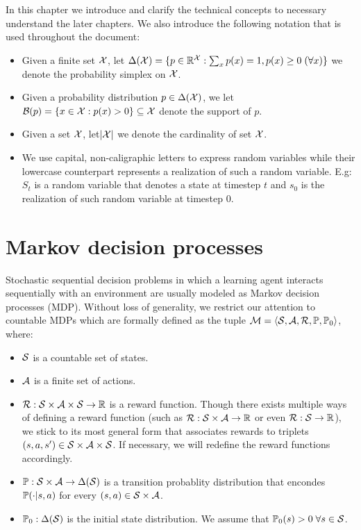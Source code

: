 In this chapter we introduce and clarify the technical concepts to necessary understand the later chapters. We also introduce the following notation that is used throughout the document:
\begin{itemize}
  \item Given a finite set $\mathcal{X}$, let $\Delta(\mathcal{X})=\{p\in\mathbb{R}^{\mathcal{X}}:\sum_x p(x)=1, p(x)\geq 0\;(\forall x)\}$ we denote the probability simplex on $\mathcal{X}$. 
  \item Given a probability distribution $p\in\Delta(\mathcal{X})$, we let $\mathcal{B}(p)=\{x\in\mathcal{X}:p(x) > 0\}\subseteq\mathcal{X}$ denote the support of $p$.
  \item Given a set $\mathcal{X}$, let$\lvert\mathcal{X}\rvert$ we denote the cardinality of set $\mathcal{X}$.
  \item We use capital, non-caligraphic letters to express random variables while their lowercase counterpart represents a realization of such a random variable. E.g: $S_t$ is a random variable that denotes a state at timestep $t$ and $s_0$ is the realization of such random variable at timestep $0$.
\end{itemize}
\section{Markov decision processes}
Stochastic sequential decision problems in which a learning agent interacts sequentially with an environment are usually modeled as Markov decision processes (MDP). Without loss of generality, we restrict our attention to countable MDPs which are formally defined as the tuple $\mathcal{M}=\langle\mathcal{S},\mathcal{A},\mathcal{R},\mathbb{P},\mathbb{P}_0\rangle$, where:
\begin{itemize}
  \item $\mathcal{S}$ is a countable set of states.
  \item $\mathcal{A}$ is a finite set of actions.
  \item $\mathcal{R}:\mathcal{S}\times\mathcal{A}\times\mathcal{S}\rightarrow\mathbb{R}$ is a reward function. Though there exists multiple ways of defining a reward function (such as $\mathcal{R}:\mathcal{S}\times\mathcal{A}\rightarrow\mathbb{R}$ or even $\linebreak\cR:\cS\rightarrow\real$), we stick to its most general form that associates rewards to triplets $\linebreak(s, a, s')\in\cS\times\cA\times\cS$. If necessary, we will redefine the reward functions accordingly.
  \item $\mathbb{P}:\mathcal{S}\times\mathcal{A}\rightarrow\Delta(\mathcal{S})$ is a transition probablity distribution that encondes $\mathbb{P}(\cdot\lvert s, a)$ for every $(s, a)\in\mathcal{S}\times\mathcal{A}$.
  \item $\mathbb{P}_0:\Delta(\mathcal{S})$ is the initial state distribution. We assume that $\mathbb{P}_0(s)>0\;\forall s\in\mathcal{S}$.
\end{itemize}

